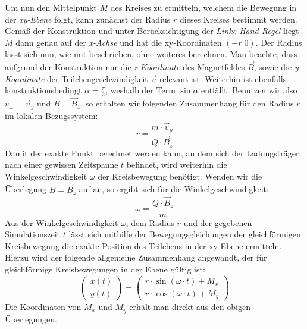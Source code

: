 Um nun den Mittelpunkt \(M\) des Kreises zu ermitteln, welchem die Bewegung in der \textit{xy-Ebene} folgt, kann zun\"achst der
Radius \(r\) dieses Kreises bestimmt werden. Gem\"a{\ss} der Konstruktion und unter Ber\"ucksichtigung der \textit{Linke-Hand-Regel}
liegt \(M\) dann genau auf der \textit{x-Achse} und hat die xy-Koordinaten \(\left(-r| 0 \right)\). Der Radius l\"asst sich nun,
wie mit  beschrieben, ohne weiteres berechnen. Man beachte, dass aufgrund der
Konstruktion nur die \textit{z-Koordinate} des Magnetfeldes \(\vec{B}\), sowie die \textit{y-Koordinate} der Teilchengeschwindigkeit
\(\vec{v}\) relevant ist. Weiterhin ist ebenfalls konstruktionsbedingt \(\alpha = \frac{\pi}{2}\), weshalb der Term \(\sin{\alpha}\)
entf\"allt. Benutzen wir also \(v_\perp = \vec{v}_y\) und \(B = \vec{B}_z\), so erhalten wir folgenden Zusammenhang f\"ur den Radius
\(r\) im lokalen Bezugssystem:
\begin{equation}
  r = \frac{m \cdot \vec{v}_y}{Q \cdot \vec{B}_z}
\end{equation}
Damit der exakte Punkt berechnet werden kann, an dem sich der Ladungstr\"ager nach einer gewissen Zeitspanne \(t\) befindet, wird
weiterhin die Winkelgeschwindigkeit \(\omega\) der Kreisbewegung ben\"otigt. Wenden wir die \"Uberlegung \(B = \vec{B}_z \) auf
 an, so ergibt sich f\"ur die Winkelgeschwindigkeit:
\begin{equation}
  \omega = \frac{Q \cdot \vec{B}_z}{m}
\end{equation}
Aus der Winkelgeschwindigkeit \(\omega\), dem Radius \(r\) und der gegebenen Simulationszeit \(t\) l\"asst sich mithilfe der
Bewegungsgleichungen der gleichf\"ormigen Kreisbewegung die exakte Position des Teilchens in der xy-Ebene ermitteln.
Hierzu wird der folgende allgemeine Zusammenhang angewandt, der f\"ur gleichf\"ormige Kreisbewegungen in der Ebene g\"ultig ist:
\begin{equation*}
  \begin{pmatrix}
    x(t) \\
    y(t)
  \end{pmatrix}
  =
  \begin{pmatrix}
    r \cdot \sin{\left(\omega \cdot t\right)} + M_x \\
    r \cdot \cos{\left(\omega \cdot t\right)} + M_y
  \end{pmatrix}
\end{equation*}
Die Koordinaten von \(M_x\) und \(M_y\) erh\"alt man direkt aus den obigen \"Uberlegungen.

